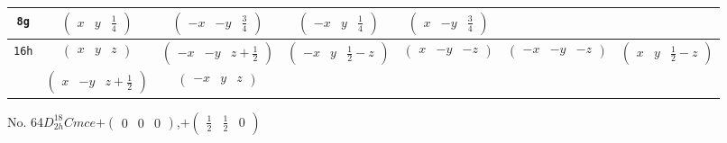 \documentclass[fleqn,9pt,landscape]{jsarticle}
\begin{document}
\begin{center}
\begin{longtable}{ccccccc}
{\tt 8g} & $ \begin{pmatrix} x & y & \frac{1}{4} \end{pmatrix} $ & $ \begin{pmatrix} - x & - y & \frac{3}{4} \end{pmatrix} $ & $ \begin{pmatrix} - x & y & \frac{1}{4} \end{pmatrix} $ & $ \begin{pmatrix} x & - y & \frac{3}{4} \end{pmatrix} $ & $  $ & $  $ \\ \hline
{\tt 16h} & $ \begin{pmatrix} x & y & z \end{pmatrix} $ & $ \begin{pmatrix} - x & - y & z + \frac{1}{2} \end{pmatrix} $ & $ \begin{pmatrix} - x & y & \frac{1}{2} - z \end{pmatrix} $ & $ \begin{pmatrix} x & - y & - z \end{pmatrix} $ & $ \begin{pmatrix} - x & - y & - z \end{pmatrix} $ & $ \begin{pmatrix} x & y & \frac{1}{2} - z \end{pmatrix} $ \\
& $ \begin{pmatrix} x & - y & z + \frac{1}{2} \end{pmatrix} $ & $ \begin{pmatrix} - x & y & z \end{pmatrix} $ & $  $ & $  $ & $  $ & $  $ \\
\end{longtable}
\end{center}
\newpage
No. 64\quad$D_{2h}^{18}$\quad$Cmce$\quad[ orthorhombic ]\quad$+\begin{pmatrix} 0 & 0 & 0 \end{pmatrix}$,\quad $+\begin{pmatrix} \frac{1}{2} & \frac{1}{2} & 0 \end{pmatrix}$
\end{document}
